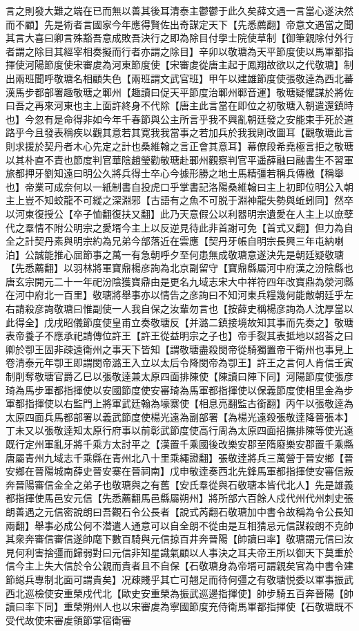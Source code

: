 言之則發大難之端在已而無以善其後耳清泰主鬱鬱于此久矣薛文遇一言當心遂決然而不顧】先是術者言國家今年應得賢佐出奇謀定天下【先悉薦翻】帝意文遇當之聞其言大喜曰卿言殊豁吾意成敗吾決行之即為除目付學士院使草制【御筆親除付外行者謂之除目其經宰相奏擬而行者亦謂之除目】辛卯以敬瑭為天平節度使以馬軍都指揮使河陽節度使宋審䖍為河東節度使【宋審䖍從唐主起于鳳翔故欲以之代敬瑭】制出兩班聞呼敬瑭名相顧失色【兩班謂文武官班】甲午以建雄節度使張敬逹為西北蕃漢馬步都部署趣敬瑭之鄆州【趣讀曰促天平節度治鄆州鄆音運】敬瑭疑懼謀於將佐曰吾之再來河東也主上面許終身不代除【唐主此言當在即位之初敬瑭入朝遣還鎮時也】今忽有是命得非如今年千春節與公主所言乎我不興亂朝廷發之安能束手死於道路乎今且發表稱疾以觀其意若其寛我我當事之若加兵於我我則改圖耳【觀敬瑭此言則求援於契丹者木心先定之計也桑維翰之言正會其意耳】幕僚段希堯極言拒之敬瑭以其朴直不責也節度判官華陰趙瑩勸敬瑭赴鄆州觀察判官平遥薛融曰融書生不習軍旅都押牙劉知遠曰明公久將兵得士卒心今據形勝之地士馬精彊若稱兵傳檄【稱舉也】帝業可成奈何以一紙制書自投虎口乎掌書記洛陽桑維翰曰主上初即位明公入朝主上豈不知蛟龍不可縱之深淵邪【古語有之魚不可脱于淵神龍失勢與蚯蚓同】然卒以河東復授公【卒子恤翻復扶又翻】此乃天意假公以利器明宗遺愛在人主上以庶孽代之羣情不附公明宗之愛壻今主上以反逆見待此非首謝可免【首式又翻】但力為自全之計契丹素與明宗約為兄弟今部落近在雲應【契丹牙帳自明宗長興三年屯納喇泊】公誠能推心屈節事之萬一有急朝呼夕至何患無成敬瑭意遂決先是朝廷疑敬瑭【先悉薦翻】以羽林將軍寶鼎楊彦詢為北京副留守【寶鼎縣屬河中府漢之汾陰縣也唐玄宗開元二十一年祀汾陰獲寶鼎由是更名九域志宋大中祥符四年改寶鼎為滎河縣在河中府北一百里】敬瑭將舉事亦以情告之彦詢曰不知河東兵糧幾何能敵朝廷乎左右請殺彦詢敬瑭曰惟副使一人我自保之汝輩勿言也【按薛史稱楊彦詢為人沈厚當以此得全】戊戌昭儀節度使皇甫立奏敬瑭反【并潞二鎮接境故知其事而先奏之】敬瑭表帝養子不應承祀請傳位許王【許王從益明宗之子也】帝手裂其表抵地以詔荅之曰卿於卾王固非疎遠衛州之事天下皆知【謂敬瑭盡殺閔帝從騎獨置帝干衛州也事見上卷清泰元年卾王即謂閔帝潞王入立以太后令降閔帝為卾王】許王之言何人肯信壬寅制削奪敬瑭官爵乙巳以張敬逹兼太原四面排陳使【陳讀曰陣下同】河陽節度使張彦琦為馬步軍都指揮使以安國節度使安審琦為馬軍都指揮使以保義節度使相里金為步軍都指揮使以右監門上將軍武廷翰為壕寨使【相息亮翻監古銜翻】丙午以張敬逹為太原四面兵馬都部署以義武節度使楊光遠為副部署【為楊光遠殺張敬逹降晉張本】丁未又以張敬逹知太原行府事以前彰武節度使高行周為太原四面招撫排陳等使光遠既行定州軍亂牙將千乘方太討平之【漢置千乘國後改樂安郡至隋廢樂安郡置千乘縣唐屬青州九域志千乘縣在青州北八十里乘繩證翻】張敬逹將兵三萬營于晉安鄉【晉安鄉在晉陽城南薛史晉安寨在晉祠南】戊申敬逹奏西北先鋒馬軍都指揮使安審信叛奔晉陽審信金全之弟子也敬瑭與之有舊【安氏羣從與石敬瑭本皆代北人】先是雄義都指揮使馬邑安元信【先悉薦翻馬邑縣屬朔州】將所部六百餘人戍代州代州刺史張朗善遇之元信密說朗曰吾觀石令公長者【說式芮翻石敬瑭加中書令故稱為令公長知兩翻】舉事必成公何不潜遣人通意可以自全朗不從由是互相猜忌元信謀殺朗不克帥其衆奔審信審信遂帥麾下數百騎與元信掠百井奔晉陽【帥讀曰率】敬瑭謂元信曰汝見何利害捨彊而歸弱對曰元信非知星識氣顧以人事決之耳夫帝王所以御天下莫重於信今主上失大信於令公親而貴者且不自保【石敬瑭身為帝壻可謂親矣官為中書令建節縂兵專制北面可謂貴矣】况疎賤乎其亡可翹足而待何彊之有敬瑭悦委以軍事振武西北巡檢使安重榮戍代北【歐史安重榮為振武巡邊指揮使】帥步騎五百奔晉陽【帥讀曰率下同】重榮朔州人也以宋審䖍為寧國節度充侍衛馬軍都指揮使【石敬瑭既不受代故使宋審䖍領節掌宿衛審